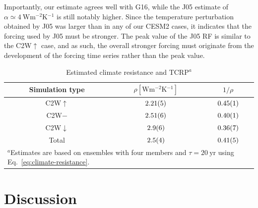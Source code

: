 \documentclass[draft]{agujournal2019}
\begin{document}
  Importantly, our estimate agrees well with G16, while the J05 estimate of \(\alpha
  \simeq \SI{4}{\watt\metre^{-2}\kelvin^{-1}}\) is still notably higher. Since the
  temperature perturbation obtained by J05 was larger than in any of our CESM2 cases, it
  indicates that the forcing used by J05 must be stronger. The peak value of the J05 RF
  is similar to the C2W\(\uparrow\) case, and as such, the overall stronger forcing must
  originate from the development of the forcing time series rather than the peak value.

  \begin{table}
    \centering

    \caption{Estimated climate resistance and TCRP\(^{a}\)}\label{tab:trcp}%
    \begin{tabular}{ccc}
      \toprule
      Simulation type & \(\rho [\si{\watt\metre^{-2}\kelvin^{-1}}]\) & \(1/\rho\) \\
      \midrule
      C2W\(\uparrow\) & \(\num{2.21\pm0.05}\) & \(\num{0.45\pm0.01}\) \\
      C2W\(-\) & \(\num{2.51\pm0.06}\) & \(\num{0.40\pm0.01}\) \\
      C2W\(\downarrow\) & \(\num{2.9\pm0.6}\) & \(\num{0.36\pm0.07}\) \\
      Total & \(\num{2.5\pm0.4}\) & \(\num{0.41\pm0.05}\) \\
      \toprule
      \multicolumn{3}{l}{\parbox{\linewidth}{\(^{a}\)Estimates are based on ensembles with four members and \(\tau
          =\SI{20}{\mathrm{yr}}\) using Eq.~\ref{eq:climate-resistance}.}} \\
    \end{tabular}
  \end{table}

  \section{Discussion}

  \label{sec:discussion}

\end{document}
